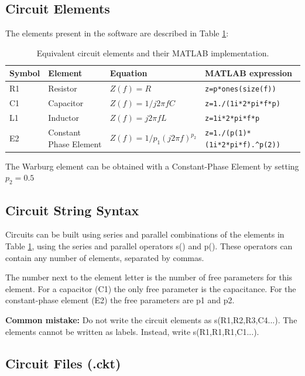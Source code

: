 \documentclass[10pt,a4paper,oneside]{book}
\begin{document}
\subsection{Circuit Elements}

The elements present in the software are described in Table \ref{circelements}:

\begin{table}[h]
	\centering
	\caption{Equivalent circuit elements and their MATLAB implementation.}
	\label{circelements}
	\begin{tabular}{llll}
		\hline \textbf{Symbol} & \textbf{Element} & \textbf{Equation} & \textbf{MATLAB expression}\\
		\hline R1 & Resistor & $Z(f) = R$ & \verb|z=p*ones(size(f))| \\ 
		C1 & Capacitor & $Z(f) = 1 / j 2\pi fC$ & \verb|z=1./(1i*2*pi*f*p)| \\ 
		L1 & Inductor & $Z(f) = j 2\pi fL$  & \verb|z=1i*2*pi*f*p| \\
		E2 & Constant Phase Element & $Z(f) = 1 / p_1 (j 2 \pi f)^{p_2} $ & \verb|z=1./(p(1)*(1i*2*pi*f).^p(2))| \\
		\hline
	\end{tabular}
\end{table}

The Warburg element can be obtained with a Constant-Phase Element by setting $p_2=0.5$


\subsection{Circuit String Syntax}

Circuits can be built using series and parallel combinations of the elements in Table \ref{circelements}, using the series and parallel operators s() and p(). These operators can contain any number of elements, separated by commas.

The number next to the element letter is the number of free parameters for this element. For a capacitor (C1) the only free parameter is the capacitance. For the constant-phase element (E2) the free parameters are p1 and p2.

\textbf{Common mistake:} Do not write the circuit elements as s(R1,R2,R3,C4...). The elements cannot be written as labels. Instead, write s(R1,R1,R1,C1...).

\subsection{Circuit Files (.ckt)}
\end{document}
